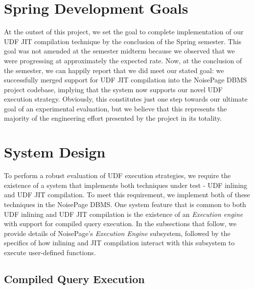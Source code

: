 \documentclass{vldb}
\begin{document}

\section{Spring Development Goals}

At the outset of this project, we set the goal to complete implementation of our UDF JIT compilation technique by the conclusion of the Spring semester. This goal was not amended at the semester midterm because we observed that we were progressing at approximately the expected rate. Now, at the conclusion of the semester, we can happily report that we did meet our stated goal: we successfully merged support for UDF JIT compilation into the NoisePage DBMS project codebase, implying that the system now supports our novel UDF execution strategy. Obviously, this constitutes just one step towards our ultimate goal of an experimental evaluation, but we believe that this represents the majority of the engineering effort presented by the project in its totality.


\section{System Design}

To perform a robust evaluation of UDF execution strategies, we require the existence of a system that implements both techniques under test - UDF inlining and UDF JIT compilation. To meet this requirement, we implement both of these techniques in the NoisePage DBMS. One system feature that is common to both UDF inlining and UDF JIT compilation is the existence of an \textit{Execution engine} with support for compiled query execution. In the subsections that follow, we provide details of NoisePage's \textit{Execution Engine} subsystem, followed by the specifics of how inlining and JIT compilation interact with this subsystem to execute user-defined functions.

\subsection{Compiled Query Execution}
\end{document}
